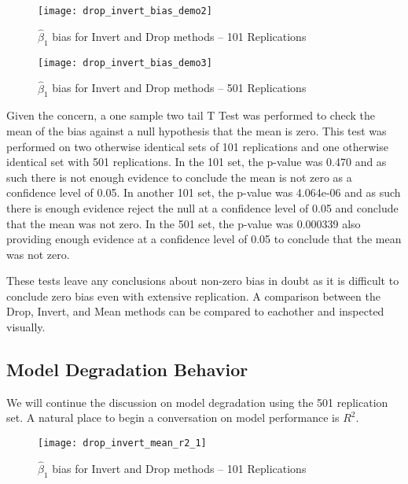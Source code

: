 \documentclass[../paper.tex]{subfiles}
\begin{document}
\begin{figure}[H]

\centering
\texttt{[image: drop\_invert\_bias\_demo2]}
\caption{$\hat{\beta}_{1}$ bias for Invert and Drop methods -- 101 Replications}
\label{fig:drop_invert_bias_demo2}
\end{figure}

\begin{figure}[H]

\centering
\texttt{[image: drop\_invert\_bias\_demo3]}
\caption{$\hat{\beta}_{1}$  bias for Invert and Drop methods -- 501 Replications}
\label{fig:drop_invert_bias_demo3}
\end{figure}

Given the concern, a one sample two tail T Test was performed to check the mean of the bias against a null hypothesis that the mean is zero.
This test was performed on two otherwise identical sets of 101 replications and one otherwise identical set with 501 replications.
In the 101 set, the p-value was 0.470 and as such there is not enough evidence to conclude the mean is not zero as a confidence level of 0.05.
In another 101 set, the p-value was 4.064e-06 and as such there is enough evidence reject the null at a confidence level of 0.05 and conclude that the mean was not zero.
In the 501 set, the p-value was 0.000339 also providing enough evidence at a confidence level of 0.05 to conclude that the mean was not zero.

These tests leave any conclusions about non-zero bias in doubt as it is difficult to conclude zero bias even with extensive replication. A comparison between the Drop, Invert, and Mean methods can be compared to eachother and inspected visually.

\subsection{Model Degradation Behavior}
We will continue the discussion on model degradation using the 501 replication set.
A natural place to begin a conversation on model performance is $R^2$.

\begin{figure}[H]

\centering
\texttt{[image: drop\_invert\_mean\_r2\_1]}
\caption{$\hat{\beta}_{1}$ bias for Invert and Drop methods -- 101 Replications}
\label{fig:drop_invert_mean_r2_1}
\end{figure}
\end{document}
